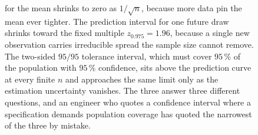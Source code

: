 \begin{figure}[htbp]
{for the mean shrinks to zero as $1/\sqrt{n}$, because more data pin the
mean ever tighter. The prediction interval for one future draw shrinks
toward the fixed multiple $z_{0.975}=1.96$, because a single new
observation carries irreducible spread the sample size cannot remove.
The two-sided $95/95$ tolerance interval, which must cover $95\,\%$ of
the population with $95\,\%$ confidence, sits above the prediction curve
at every finite $n$ and approaches the same limit only as the estimation
uncertainty vanishes. The three answer three different questions, and an
engineer who quotes a confidence interval where a specification demands
population coverage has quoted the narrowest of the three by mistake.}
\label{fig:vol02ch14:tolerance-interval}
\end{figure}
